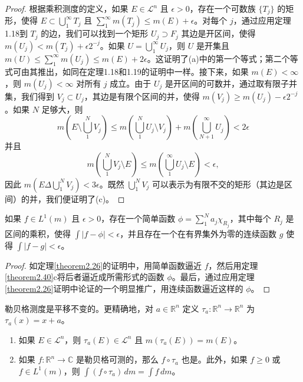 \documentclass[lang=cn,10pt,thmcnt=section]{elegantbook}
\begin{document}
\begin{proof}
根据乘积测度的定义，如果 $E \in \mathcal{L}^n$ 且 $\epsilon > 0$，存在一个可数族 $\{T_j\}$ 的矩形，使得 $E \subset \bigcup_1^\infty T_j$ 且 $\sum_1^\infty m(T_j) \le m(E) + \epsilon$。对每个 $j$，通过应用定理1.18到 $T_j$ 的边，我们可以找到一个矩形 $U_j \supset F_j$ 其边是开区间，使得 $m(U_j) < m(T_j) + \epsilon 2^{-j}$。如果 $U = \bigcup_1^\infty U_j$，则 $U$ 是开集且 $m(U) \le \sum_1^\infty m(U_j) \le m(E) + 2\epsilon$。这证明了(a)中的第一个等式；第二个等式可由其推出，如同在定理1.18和1.19的证明中一样。接下来，如果 $m(E) < \infty$，则 $m(U_j) < \infty$ 对所有 $j$ 成立。由于 $U_j$ 是开区间的可数并，通过取有限子并集，我们得到 $V_j \subset U_j$，其边是有限个区间的并，使得 $m(V_j) \ge m(U_j) - \epsilon 2^{-j}$。如果 $N$ 足够大，则
\[ m(E \setminus \bigcup_1^N V_j) \le m(\bigcup_1^N U_j \setminus V_j) + m(\bigcup_{N+1}^\infty U_j) < 2\epsilon \]
并且
\[ m(\bigcup_1^N V_j \setminus E) \le m(\bigcup_1^\infty U_j \setminus E) < \epsilon, \]
因此 $m(E \Delta \bigcup_1^N V_j) < 3\epsilon$。既然 $\bigcup_1^N V_j$ 可以表示为有限不交的矩形（其边是区间）的并，我们便证明了(c)。
\end{proof}

\begin{theorem}\label{theorem2.41}
如果 $f \in L^1(m)$ 且 $\epsilon > 0$，存在一个简单函数 $\phi = \sum_1^N a_j \chi_{R_j}$，其中每个 $R_j$ 是区间的乘积，使得 $\int |f-\phi| < \epsilon$，并且存在一个在有界集外为零的连续函数 $g$ 使得 $\int |f-g| < \epsilon$。
\end{theorem}

\begin{proof}
如定理\ref{theorem2.26}的证明中，用简单函数逼近 $f$，然后用定理\ref{theorem2.40}c将后者逼近成所需形式的函数 $\phi$。最后，通过应用定理\ref{theorem2.26}证明中论证的一个明显推广，用连续函数逼近这样的 $\phi$。
\end{proof}

\begin{theorem}\label{theorem2.42}
勒贝格测度是平移不变的。更精确地，对 $a \in \mathbb{R}^n$ 定义 $\tau_a : \mathbb{R}^n \to \mathbb{R}^n$ 为 $\tau_a(x) = x+a$。
\begin{enumerate}[label=\alph*.]
\item 如果 $E \in \mathcal{L}^n$，则 $\tau_a(E) \in \mathcal{L}^n$ 且 $m(\tau_a(E)) = m(E)$。
\item 如果 $f : \mathbb{R}^n \to \mathbb{C}$ 是勒贝格可测的，那么 $f \circ \tau_a$ 也是。此外，如果 $f \ge 0$ 或 $f \in L^1(m)$，则 $\int (f \circ \tau_a) \,dm = \int f \,dm$。
\end{enumerate}
\end{theorem}
\end{document}
